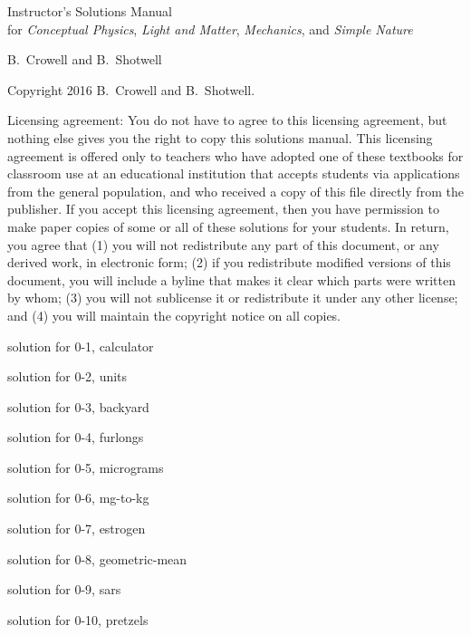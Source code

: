 \documentclass{problems}
\begin{document}
\begin{titlepage}
	\centering
        {\Huge Instructor's Solutions Manual}\\
        for \emph{Conceptual Physics}, \emph{Light and Matter}, \emph{Mechanics}, and \emph{Simple Nature}


	\vspace{1cm}

        {\Large B.~Crowell and B.~Shotwell}
\end{titlepage}


\noindent Copyright 2016 B.~Crowell and B.~Shotwell.

Licensing agreement: You do not have to agree to this licensing agreement, but nothing
else gives you the right to copy this solutions manual. This licensing agreement is offered only
to teachers who have adopted one of these textbooks for classroom use at an educational institution
that accepts students via applications from the general population, and who received a copy
of this file directly from the publisher. If you accept this licensing
agreement, then you have permission to make paper copies of some or all of these solutions for your
students. In return, you agree that (1) you will not redistribute any part of this document, or any derived work,
in electronic form; (2) if you redistribute modified versions of this document,
you will include a byline that makes it clear which parts were written by whom; (3) you will
not sublicense it or redistribute it under any other license; and (4) you will maintain the
copyright notice on all copies.


\vspace{2cm}

\noindent  

\tableofcontents
\timetravelenable

solution for 0-1, calculator

solution for 0-2, units

solution for 0-3, backyard

solution for 0-4, furlongs

solution for 0-5, micrograms

solution for 0-6, mg-to-kg

solution for 0-7, estrogen

solution for 0-8, geometric-mean

solution for 0-9, sars

solution for 0-10, pretzels
\end{document}

